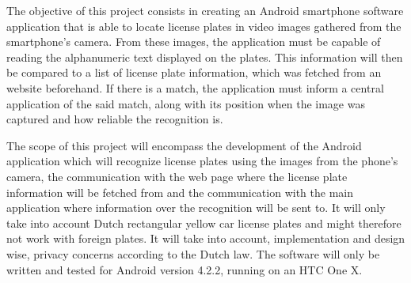 
The objective of this project consists in creating an Android smartphone software application that is able to locate license plates in video images gathered from the smartphone's camera. From these images, the application must be capable of reading the alphanumeric text displayed on the plates. This information will then be compared to a list of license plate information, which was fetched from an website beforehand. If there is a match, the application must inform a central application of the said match, along with its position when the image was captured and how reliable the recognition is.


The scope of this project will encompass the development of the Android application which will recognize license plates using the images from the phone's camera, the communication with the web page where the license plate information will be fetched from and the communication with the main application where information over the recognition will be sent to. It will only take into account Dutch rectangular yellow car license plates and might therefore not work with foreign plates. It will take into account, implementation and design wise, privacy concerns according to the Dutch law. The software will only be written and tested for Android version 4.2.2, running on an HTC One X.
